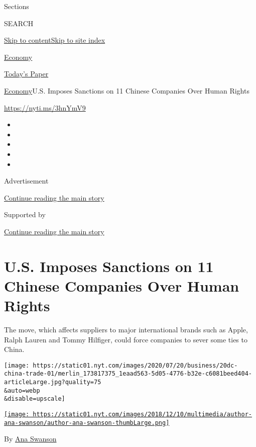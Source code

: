 Sections

SEARCH

\protect\hyperlink{site-content}{Skip to
content}\protect\hyperlink{site-index}{Skip to site index}

\href{https://www.nytimes.com/section/business/economy}{Economy}

\href{https://myaccount.nytimes.com/auth/login?response_type=cookie\&client_id=vi}{}

\href{https://www.nytimes.com/section/todayspaper}{Today's Paper}

\href{/section/business/economy}{Economy}\textbar{}U.S. Imposes
Sanctions on 11 Chinese Companies Over Human Rights

\url{https://nyti.ms/3hnYmV9}

\begin{itemize}
\item
\item
\item
\item
\item
\end{itemize}

Advertisement

\protect\hyperlink{after-top}{Continue reading the main story}

Supported by

\protect\hyperlink{after-sponsor}{Continue reading the main story}

\hypertarget{us-imposes-sanctions-on-11-chinese-companies-over-human-rights}{%
\section{U.S. Imposes Sanctions on 11 Chinese Companies Over Human
Rights}\label{us-imposes-sanctions-on-11-chinese-companies-over-human-rights}}

The move, which affects suppliers to major international brands such as
Apple, Ralph Lauren and Tommy Hilfiger, could force companies to sever
some ties to China.

\texttt{[image: https://static01.nyt.com/images/2020/07/20/business/20dc-china-trade-01/merlin\_173817375\_1eaad563-5d05-4776-b32e-c6081beed404-articleLarge.jpg?quality=75\\\&auto=webp\\\&disable=upscale]}

\href{https://www.nytimes.com/by/ana-swanson}{\texttt{[image: https://static01.nyt.com/images/2018/12/10/multimedia/author-ana-swanson/author-ana-swanson-thumbLarge.png]}}

By \href{https://www.nytimes.com/by/ana-swanson}{Ana Swanson}

